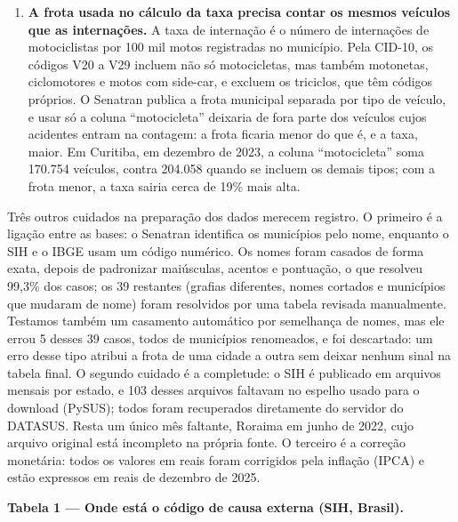 \documentclass[
  11pt,
]{article}
\begin{document}
\begin{enumerate}
\item \textbf{A frota usada no cálculo da taxa precisa contar os mesmos veículos que as internações.} A taxa de internação é o número de internações de motociclistas por 100 mil motos registradas no município. Pela CID-10, os códigos V20 a V29 incluem não só motocicletas, mas também motonetas, ciclomotores e motos com side-car, e excluem os triciclos, que têm códigos próprios. O Senatran publica a frota municipal separada por tipo de veículo, e usar só a coluna ``motocicleta'' deixaria de fora parte dos veículos cujos acidentes entram na contagem: a frota ficaria menor do que é, e a taxa, maior. Em Curitiba, em dezembro de 2023, a coluna ``motocicleta'' soma 170.754 veículos, contra 204.058 quando se incluem os demais tipos; com a frota menor, a taxa sairia cerca de 19\% mais alta.
\end{enumerate}

Três outros cuidados na preparação dos dados merecem registro. O primeiro é a ligação entre as bases: o Senatran identifica os municípios pelo nome, enquanto o SIH e o IBGE usam um código numérico. Os nomes foram casados de forma exata, depois de padronizar maiúsculas, acentos e pontuação, o que resolveu 99,3\% dos casos; os 39 restantes (grafias diferentes, nomes cortados e municípios que mudaram de nome) foram resolvidos por uma tabela revisada manualmente. Testamos também um casamento automático por semelhança de nomes, mas ele errou 5 desses 39 casos, todos de municípios renomeados, e foi descartado: um erro desse tipo atribui a frota de uma cidade a outra sem deixar nenhum sinal na tabela final. O segundo cuidado é a completude: o SIH é publicado em arquivos mensais por estado, e 103 desses arquivos faltavam no espelho usado para o download (PySUS); todos foram recuperados diretamente do servidor do DATASUS. Resta um único mês faltante, Roraima em junho de 2022, cujo arquivo original está incompleto na própria fonte. O terceiro é a correção monetária: todos os valores em reais foram corrigidos pela inflação (IPCA) e estão expressos em reais de dezembro de 2025.

\textbf{Tabela 1 --- Onde está o código de causa externa (SIH, Brasil).}
\end{document}
